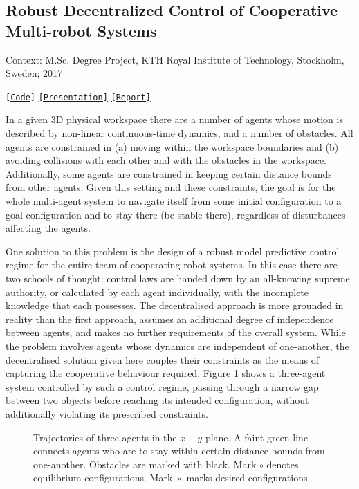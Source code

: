 \subsection{Robust Decentralized Control of Cooperative Multi-robot Systems}

Context: M.Sc. Degree Project, KTH Royal Institute of Technology, Stockholm, Sweden; 2017

\noindent \href{https://github.com/li9i/KTH_thesis_simulations}{\texttt{[Code]}} \href{https://github.com/li9i/KTH_thesis_presentation}{\texttt{[Presentation]}} \href{https://github.com/li9i/KTH_thesis_presentation}{\texttt{[Report]}}\\

\begin{problem}
In a given 3D physical workspace there are a number of agents whose motion is
described by non-linear continuous-time dynamics, and a number of obstacles.
All agents are constrained in (a) moving within the workspace boundaries and
(b) avoiding collisions with each other and with the obstacles in the
workspace. Additionally, some agents are constrained in keeping certain
distance bounds from other agents. Given this setting and these constraints,
the goal is for the whole multi-agent system to navigate itself from some
initial configuration to a goal configuration and to stay there (be stable
there), regardless of disturbances affecting the agents.
\end{problem}

One solution to this problem is the design of a robust model predictive control
regime for the entire team of cooperating robot systems. In this case there are
two schools of thought: control laws are handed down by an all-knowing supreme
authority, or calculated by each agent individually, with the incomplete
knowledge that each possesses. The decentralised approach is more grounded in
reality than the first approach, assumes an additional degree of independence
between agents, and makes no further requirements of the overall system. While
the problem involves agents whose dynamics are independent of one-another, the
decentralised solution given here couples their constraints as the means of
capturing the cooperative behaviour required.  Figure
\ref{fig:d_OFF_res_trajectory_3_2} shows a three-agent system controlled by
such a control regime, passing through a narrow gap between two objects before
reaching its intended configuration, without additionally violating its
prescribed constraints.

\begin{figure}[H]\centering
  \scalebox{0.8}{}
  \caption{\small Trajectories of three agents in the $x-y$ plane. A faint
           green line connects agents who are to stay within certain distance
           bounds from one-another. Obstacles are marked with black. Mark
           $\circ$ denotes equilibrium configurations. Mark $\times$ marks
           desired configurations}
  \label{fig:d_OFF_res_trajectory_3_2}
\end{figure}

